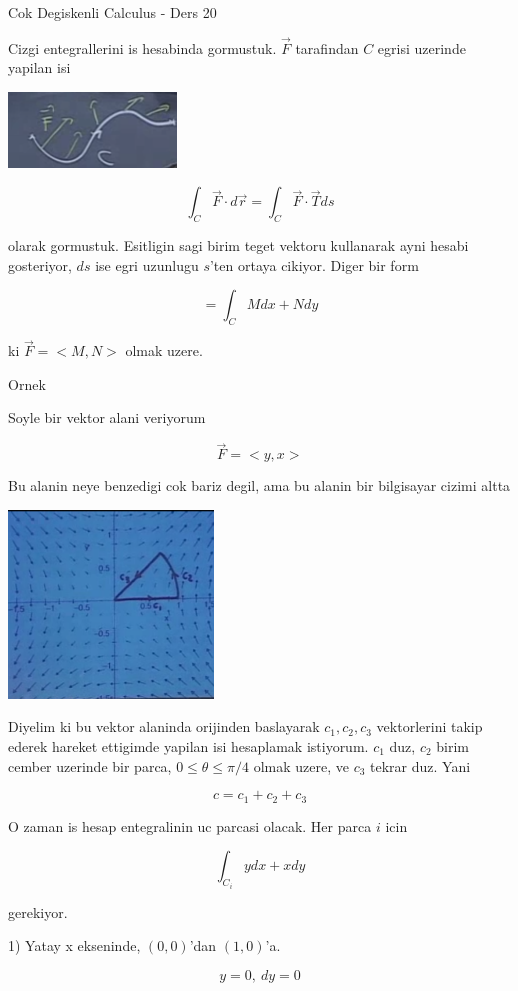 \documentclass[12pt,fleqn]{article}
\begin{document}
Cok Degiskenli Calculus - Ders 20

Cizgi entegrallerini is hesabinda gormustuk. $\vec{F}$ tarafindan $C$
egrisi uzerinde yapilan isi

\includegraphics[height=2cm]{20_1.png}

\[ \int_C \vec{F} \cdot d\vec{r} =  \int_C \vec{F} \cdot \vec{T} ds \]

olarak gormustuk. Esitligin sagi birim teget vektoru kullanarak ayni hesabi
gosteriyor, $ds$ ise egri uzunlugu $s$'ten ortaya cikiyor. Diger bir form

\[ = \int_C M dx + N dy \]

ki $\vec{F} = <M,N>$ olmak uzere. 

Ornek 

Soyle bir vektor alani veriyorum

\[ \vec{F} = <y,x> \]

Bu alanin neye benzedigi cok bariz degil, ama bu alanin bir bilgisayar
cizimi altta

\includegraphics[height=5cm]{20_2.png}

Diyelim ki bu vektor alaninda orijinden baslayarak $c_1,c_2,c_3$
vektorlerini takip ederek hareket ettigimde yapilan isi hesaplamak
istiyorum. $c_1$ duz, $c_2$ birim cember uzerinde bir parca, $0 \le \theta
\le \pi / 4$ 
olmak uzere, ve $c_3$ tekrar duz. Yani 

\[ c = c_1 + c_2 + c_3 \]

O zaman is hesap entegralinin uc parcasi olacak. Her parca $i$ icin 

\[ \int_{C_i} y dx + x dy\]

gerekiyor. 

1) Yatay x ekseninde, $(0,0)$'dan $(1,0)$'a. 

\[ y = 0, \ dy = 0 \]
\end{document}
